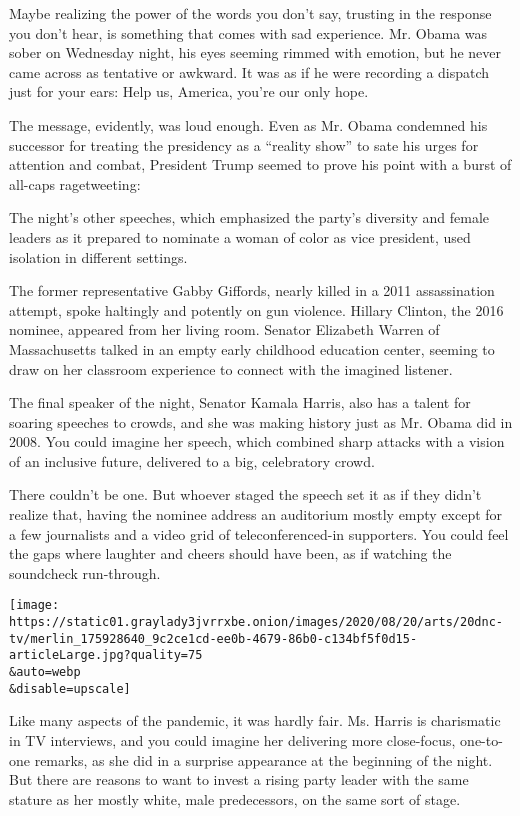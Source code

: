 Maybe realizing the power of the words you don't say, trusting in the
response you don't hear, is something that comes with sad experience.
Mr. Obama was sober on Wednesday night, his eyes seeming rimmed with
emotion, but he never came across as tentative or awkward. It was as if
he were recording a dispatch just for your ears: Help us, America,
you're our only hope.

The message, evidently, was loud enough. Even as Mr. Obama condemned his
successor for treating the presidency as a ``reality show'' to sate his
urges for attention and combat, President Trump seemed to prove his
point with a burst of all-caps ragetweeting:

The night's other speeches, which emphasized the party's diversity and
female leaders as it prepared to nominate a woman of color as vice
president, used isolation in different settings.

The former representative Gabby Giffords, nearly killed in a 2011
assassination attempt, spoke haltingly and potently on gun violence.
Hillary Clinton, the 2016 nominee, appeared from her living room.
Senator Elizabeth Warren of Massachusetts talked in an empty early
childhood education center, seeming to draw on her classroom experience
to connect with the imagined listener.

The final speaker of the night, Senator Kamala Harris, also has a talent
for soaring speeches to crowds, and she was making history just as Mr.
Obama did in 2008. You could imagine her speech, which combined sharp
attacks with a vision of an inclusive future, delivered to a big,
celebratory crowd.

There couldn't be one. But whoever staged the speech set it as if they
didn't realize that, having the nominee address an auditorium mostly
empty except for a few journalists and a video grid of
teleconferenced-in supporters. You could feel the gaps where laughter
and cheers should have been, as if watching the soundcheck run-through.

\texttt{[image: https://static01.graylady3jvrrxbe.onion/images/2020/08/20/arts/20dnc-tv/merlin\_175928640\_9c2ce1cd-ee0b-4679-86b0-c134bf5f0d15-articleLarge.jpg?quality=75\\\&auto=webp\\\&disable=upscale]}

Like many aspects of the pandemic, it was hardly fair. Ms. Harris is
charismatic in TV interviews, and you could imagine her delivering more
close-focus, one-to-one remarks, as she did in a surprise appearance at
the beginning of the night. But there are reasons to want to invest a
rising party leader with the same stature as her mostly white, male
predecessors, on the same sort of stage.


